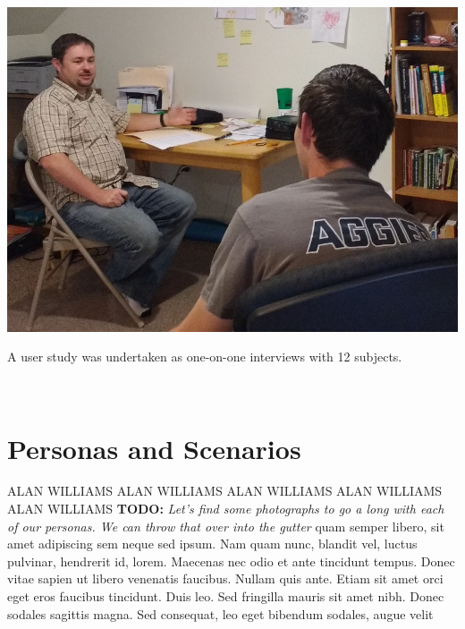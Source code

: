 \documentclass{sigchi-ext}
\begin{document}
\begin{marginfigure}[-15pc]
  \begin{minipage}{\marginparwidth}
    \centering
    \includegraphics[width=0.9\marginparwidth]{figures/user_study.jpg}
    \caption{A user study was undertaken as one-on-one interviews with 12 subjects.}~\label{fig:marginfig}
  \end{minipage}
\end{marginfigure}



\section{Personas and Scenarios}
ALAN WILLIAMS ALAN WILLIAMS ALAN WILLIAMS ALAN WILLIAMS ALAN WILLIAMS
\textbf{TODO:}
\textit{Let's find some photographs to go a long with each of our personas.
We can throw that over into the gutter}
quam semper libero, sit amet adipiscing sem neque sed ipsum. Nam quam
nunc, blandit vel, luctus pulvinar, hendrerit id, lorem. Maecenas nec
odio et ante tincidunt tempus. Donec vitae sapien ut libero venenatis
faucibus. Nullam quis ante. Etiam sit amet orci eget eros faucibus
tincidunt. Duis leo. Sed fringilla mauris sit amet nibh. Donec sodales
sagittis magna. Sed consequat, leo eget bibendum sodales, augue velit

\end{document}
